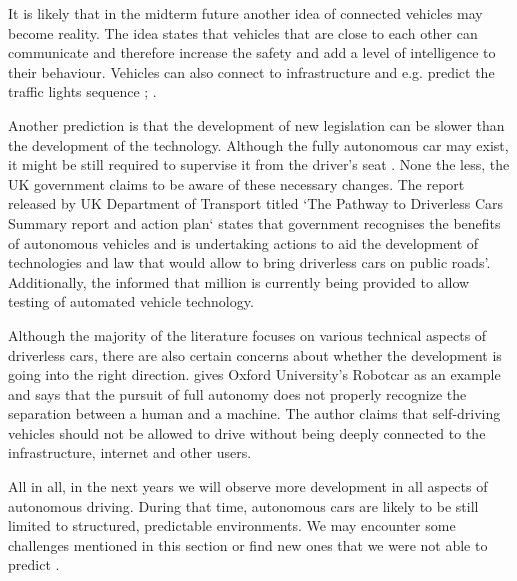 \documentclass[11pt,english,twoside]{article}
\begin{document}
\par


It is likely that in the midterm future another idea of connected vehicles may become reality. The idea states that vehicles that are close to each other can communicate and therefore increase the safety and add a level of intelligence to their behaviour. Vehicles can also connect to infrastructure and e.g. predict the traffic lights sequence \citep{narla2013evolution} ; \citep{luettel2012autonomous}.

\par
Another prediction is that the development of new legislation can be slower than the development of the technology. Although the fully autonomous car may exist, it might be still required to supervise it from the driver's seat \citep{luettel2012autonomous}. None the less, the UK government claims to be aware of these necessary changes. The report released by UK Department of Transport titled `The Pathway to Driverless Cars Summary report and action plan` \citep{pathwaytodriverless} states that government recognises the benefits of autonomous vehicles and is undertaking actions to aid the development of technologies and law that would allow to bring driverless cars on public roads'. Additionally, the \citet{pathwaytodriverless2} informed that  million is currently being provided  to allow testing of automated vehicle technology.

\par
Although the majority of the literature focuses on various technical aspects of driverless cars, there are also certain concerns about whether the development is going into the right direction. \citet{mcbride2016ethics} gives Oxford University’s Robotcar as an example and  says that the pursuit of full autonomy does not properly recognize the separation between a human and a machine. The author claims that self-driving vehicles should not be allowed to drive without being deeply connected to the infrastructure, internet and other users.



\par
All in all, in the next years we will observe more development in all aspects of autonomous driving. 
During that time, autonomous cars are likely to be still limited to structured, predictable environments.
We may encounter some challenges mentioned in this section or find new ones that we were not able to predict \citep{luettel2012autonomous}.
\end{document}
